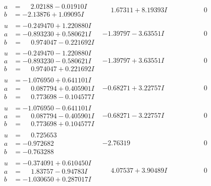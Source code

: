\documentclass[1p]{elsarticle_modified}
\theoremstyle{definition}
\begin{document}
$$\begin{array}{c|c|c}
\begin{aligned}
a &= \phantom{-}2.02188 - 0.01910 I \\
b &= -2.13876 + 1.09095 I\end{aligned}
 & \phantom{-}1.67311 + 8.19393 I & \phantom{-0.000000 } 0 \\ \hline\begin{aligned}
u &= -0.249470 + 1.220880 I \\
a &= -0.893230 + 0.580621 I \\
b &= \phantom{-}0.974047 - 0.221692 I\end{aligned}
 & -1.39797 - 3.63551 I & \phantom{-0.000000 } 0 \\ \hline\begin{aligned}
u &= -0.249470 - 1.220880 I \\
a &= -0.893230 - 0.580621 I \\
b &= \phantom{-}0.974047 + 0.221692 I\end{aligned}
 & -1.39797 + 3.63551 I & \phantom{-0.000000 } 0 \\ \hline\begin{aligned}
u &= -1.076950 + 0.641101 I \\
a &= \phantom{-}0.087794 + 0.405901 I \\
b &= \phantom{-}0.773698 - 0.104577 I\end{aligned}
 & -0.68271 + 3.22757 I & \phantom{-0.000000 } 0 \\ \hline\begin{aligned}
u &= -1.076950 - 0.641101 I \\
a &= \phantom{-}0.087794 - 0.405901 I \\
b &= \phantom{-}0.773698 + 0.104577 I\end{aligned}
 & -0.68271 - 3.22757 I & \phantom{-0.000000 } 0 \\ \hline\begin{aligned}
u &= \phantom{-}0.725653\phantom{ +0.000000I} \\
a &= -0.972682\phantom{ +0.000000I} \\
b &= -0.763288\phantom{ +0.000000I}\end{aligned}
 & -2.76319\phantom{ +0.000000I} & \phantom{-0.000000 } 0 \\ \hline\begin{aligned}
u &= -0.374091 + 0.610450 I \\
a &= \phantom{-}1.83757 - 0.94783 I \\
b &= -1.030650 + 0.287017 I\end{aligned}
 & \phantom{-}4.07537 + 3.90489 I & \phantom{-0.000000 } 0 \\ \hline\begin{aligned}

\end{aligned}
\end{array}$$
\end{document}
